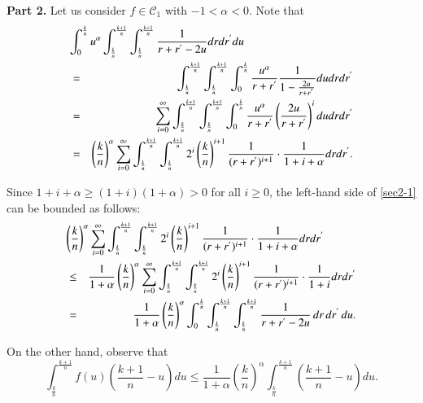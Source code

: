 \documentclass[preprint,12pt,authoryear]{elsarticle}
\begin{document}
\textbf{Part 2.} Let us consider  $f\in\mathcal{C}_1$ with $-1<\alpha<0$. Note that
\begin{eqnarray}\label{sec2-1}
 \lefteqn{\int_0^{\frac{k}{n}} u^\alpha\int_{\frac{k}{n}}^{\frac{k+1}{n}}\int_{\frac{k}{n}}^{\frac{k+1}{n}}\frac{1}{r+r^{'}-2u}drdr^{'}du}\nonumber\\
 &=& \int_{\frac{k}{n}}^{\frac{k+1}{n}}\int_{\frac{k}{n}}^{\frac{k+1}{n}}\int_0^{\frac{k}{n}}\frac{u^{\alpha}}{r+r^{'}}\frac{1}{1-\frac{2u}{r+r^{'}}}dudrdr^{'}\nonumber\\
 &=& \sum_{i=0}^{\infty} \int_{\frac{k}{n}}^{\frac{k+1}{n}}\int_{\frac{k}{n}}^{\frac{k+1}{n}}\int_0^{\frac{k}{n}}\frac{u^{\alpha}}{r+r^{'}}\left(\frac{2u}{r+r^{'}}\right)^i dudrdr^{'}\\\nonumber
 &=& \left(\frac{k}{n}\right)^{\alpha}\sum_{i=0}^{\infty} \int_{\frac{k}{n}}^{\frac{k+1}{n}}\int_{\frac{k}{n}}^{\frac{k+1}{n}} 2^i \left(\frac{k}{n}\right)^{i+1} \frac{1}{(r+r^{'})^{i+1}} \cdot \frac{1}{1+i+\alpha} drdr^{'}.
\end{eqnarray}

Since $1+i+\alpha \geq (1+i)(1+\alpha) > 0$ for all $i\geq 0$, the left-hand side of \eqref{sec2-1} can be bounded as follows:
\begin{eqnarray}\label{sec2-2}
\lefteqn{\left(\frac{k}{n}\right)^{\alpha} \sum_{i=0}^{\infty} \int_{\frac{k}{n}}^{\frac{k+1}{n}} \int_{\frac{k}{n}}^{\frac{k+1}{n}} 2^i \left(\frac{k}{n}\right)^{i+1} \frac{1}{(r+r^{'})^{i+1}} \cdot \frac{1}{1+i+\alpha} drdr^{'}} \nonumber\\
&\leq& \frac{1}{1+\alpha} \left(\frac{k}{n}\right)^{\alpha} \sum_{i=0}^{\infty} \int_{\frac{k}{n}}^{\frac{k+1}{n}} \int_{\frac{k}{n}}^{\frac{k+1}{n}} 2^i \left(\frac{k}{n}\right)^{i+1} \frac{1}{(r+r^{'})^{i+1}} \cdot \frac{1}{1+i} drdr^{'} \nonumber\\
&=& \frac{1}{1+\alpha} \left(\frac{k}{n}\right)^{\alpha} \int_0^{\frac{k}{n}} \int_{\frac{k}{n}}^{\frac{k+1}{n}} \int_{\frac{k}{n}}^{\frac{k+1}{n}} \frac{1}{r+r^{'} - 2u} \, dr \, dr^{'} \, du.
\end{eqnarray}

On the other hand, observe that
\begin{equation}\label{sec2-3}
\int_{\frac{k}{n}}^{\frac{k+1}{n}} f(u)\left(\frac{k+1}{n}-u\right) du \leq \frac{1}{1+\alpha} \left(\frac{k}{n}\right)^{\alpha} \int_{\frac{k}{n}}^{\frac{k+1}{n}} \left(\frac{k+1}{n}-u\right) du.
\end{equation}
\end{document}
